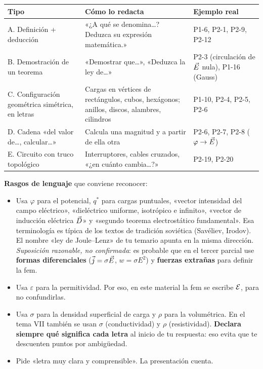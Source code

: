 \documentclass[11pt]{article}
\begin{document}
\begin{center}
\small
\begin{tabularx}{\linewidth}{@{}p{3.1cm}X p{4.3cm}@{}}
\toprule
\textbf{Tipo} & \textbf{Cómo lo redacta} & \textbf{Ejemplo real}\\
\midrule
A. Definición + deducción & «¿A qué se denomina\dots? Deduzca su expresión matemática.» & P1-6, P2-1, P2-9, P2-12\\
B. Demostración de un teorema & «Demostrar que\dots», «Deduzca la ley de\dots» & P2-3 (circulación de $\vec{E}$ nula), P1-16 (Gauss)\\
C. Configuración geométrica simétrica, en letras & Cargas en vértices de rectángulos, cubos, hexágonos; anillos, discos, alambres, cilindros & P1-10, P2-4, P2-5, P2-6\\
D. Cadena «del valor de\dots, calcular\dots» & Calcula una magnitud y a partir de ella otra & P2-6, P2-7, P2-8 ($\varphi\to\vec{E}$)\\
E. Circuito con truco topológico & Interruptores, cables cruzados, «¿en cuánto cambia\dots?» & P2-19, P2-20\\
\bottomrule
\end{tabularx}
\end{center}

\textbf{Rasgos de lenguaje} que conviene reconocer:
\begin{itemize}
\item Usa $\varphi$ para el potencial, $q^*$ para cargas puntuales, «vector intensidad del campo eléctrico», «dieléctrico uniforme, isotrópico e infinito», «vector de inducción eléctrica $\vec{D}$» y «segundo teorema electrostático fundamental». Esa terminología es típica de los textos de tradición soviética (Savéliev, Irodov). El nombre «ley de Joule--Lenz» de tu temario apunta en la misma dirección. \emph{Suposición razonable, no confirmada}: es probable que en el tercer parcial use \textbf{formas diferenciales} ($\vec{j}=\sigma\vec{E}$, $w=\sigma E^2$) y \textbf{fuerzas extrañas} para definir la fem.
\item Usa $\varepsilon$ para la permitividad. Por eso, en este material la fem se escribe $\mathcal{E}$, para no confundirlas.
\item Usa $\sigma$ para la densidad superficial de carga y $\rho$ para la volumétrica. En el tema VII también se usan $\sigma$ (conductividad) y $\rho$ (resistividad). \textbf{Declara siempre qué significa cada letra} al inicio de tu respuesta: eso evita que te descuenten puntos por ambigüedad.
\item Pide «letra muy clara y comprensible». La presentación cuenta.
\end{itemize}
\end{document}
